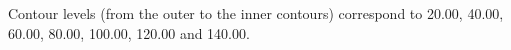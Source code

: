 Contour levels (from the outer to the inner contours) correspond to 20.00, 40.00, 60.00, 80.00, 100.00, 120.00 and 140.00.
